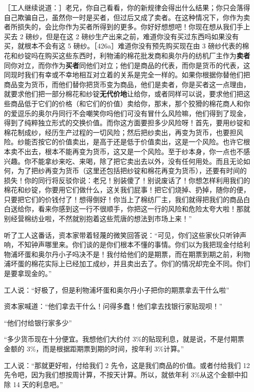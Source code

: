 ［工人继续说道：］老兄，你自己看看，你的新规律会得出什么结果；你只会落得自己欺骗自己，虽然你一时是买者，但过后又成了卖者。在这种情况下，你作为卖者所损失的，会比你作为买者所得到的更多。你好好想想吧！你现在想从我们手上买去 2 磅纱，但是在这 2 磅纱生产出来之前，难道你没有买过东西吗如果没有买，就根本不会有这 5 磅纱。［426a］难道你没有预先购买现在由 3 磅纱代表的棉花和纱锭吗在购买这些东西时，利物浦的棉花批发商和奥尔丹的纺机厂主作为\textbf{卖者}同你对立，而你作为\textbf{买者}同他们对立；他们是商品的代表，而你是货币的代表，这同现时我们有幸或不幸地相互对立着的关系是完全一样的。如果你根据你替他们把商品变为货币，而他们替你把货币变为商品，他们是卖者，你是买者这一点理由，就要求他们把一部分棉花和纱锭\textbf{无代价地}让给你，或者同样可以说，要求他们把这些商品低于它们的价格（和它们的价值）卖给你，那末，那个狡猾的棉花商人和你的爱逗乐的奥尔丹同行不会嘲笑你吗他们可没有冒什么风险嘛，他们得到了现金，得到了纯粹独立形式的交换价值。而你这方面要担多少风险呀！首先，要用纱锭和棉花制成纱，经历生产过程的一切风险；然后把纱卖出，再变为货币，也要担风险。纱能否按它的价值卖出，是高于还是低于价值卖出，这是一个风险。也许它根本卖不出去，根本不能再变为货币，这又是一个风险。至于纱本身，你一点也不感兴趣。你不能拿纱来吃、来喝，除了把它卖出去以外，没有任何用处。而且无论如何，为了把纱再变为货币（这里还包括把纱锭和棉花再变为货币），还要有时间的损失！你的同行将反驳你说：老兄！别装傻了！别说废话了！你想怎样利用我们的棉花和纱锭，你要用它们做什么，这关我们屁事！把它们烧掉、扔掉，随你的便，只要把它们的价钱付了！想得倒好！你当上了棉纺厂主，我们就得把我们的商品白白送给你，看来你感到这一行不很顺手，你把这一行的风险和危险太夸大啦！那就别经营棉纺业啦，不然就别抱着这些荒唐的想法到市场上来！”

听了工人这番话，资本家带着轻蔑的微笑回答说：“可见，你们这些家伙只听钟声响，不知钟声哪里来。你们谈的是你们根本不懂的事情。你们以为我把现金付给利物浦坏蛋和奥尔丹小子吗决不是！我付给他们的是期票，而在期票到期之前，利物浦坏蛋的棉花实际上已经加工成纱，并且卖出去了。你们的情况却完全不同。你们是要拿现金的。”

工人说：“好极了，但是利物浦坏蛋和奥尔丹小子把你的期票拿去干什么啦”

资本家喊道：“他们拿去干什么！问得多蠢！他们拿去找银行家贴现呗！”

“他们付给银行家多少”

“多少货币现在十分便宜。我想他们大约付 3\%的贴现利息，就是说，不是付期票金额的 3\%，而是根据距期票到期的时间，按年利 3\%计算。”

工人说：“那就更好啦，付给我们 2 先令，这是我们商品的价值。或者付给我们 12 先令吧，因为我们想按周计算，不按天计算。所以，就依年利 3\%从这个金额中扣除 14 天的利息吧。”

